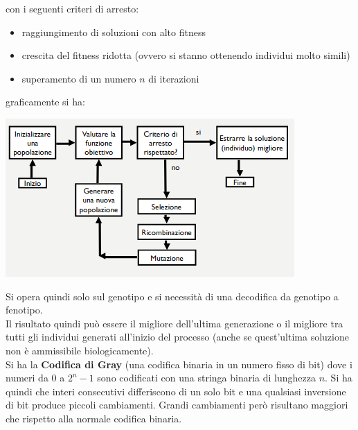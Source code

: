 \documentclass[a4paper,12pt, oneside]{book}
\begin{document}
con i seguenti criteri di arresto:
\begin{itemize}
  \item raggiungimento di soluzioni con alto fitness
  \item crescita del fitness ridotta (ovvero si stanno ottenendo
  individui molto simili)
  \item superamento di un numero $n$ di iterazioni
\end{itemize}
graficamente si ha:
\begin{center}
  \includegraphics[scale = 0.7]{img/bio2.png}
\end{center}
Si opera quindi solo sul genotipo e si necessità di una decodifica da
genotipo a fenotipo. \\
Il risultato quindi può essere il migliore dell'ultima generazione o
il migliore tra tutti gli individui generati all'inizio del processo
(anche se quest'ultima soluzione non è ammissibile biologicamente).\\
Si ha la \textbf{Codifica di Gray} (una codifica binaria in un
numero fisso di bit) dove i numeri da 0 a $2^n-1$ sono
codificati con una stringa binaria di lunghezza $n$. Si ha quindi che
interi consecutivi differiscono di un solo bit e una qualsiasi
inversione di bit produce piccoli cambiamenti. Grandi cambiamenti però
risultano maggiori che rispetto alla normale codifica binaria.\\
\end{document}
